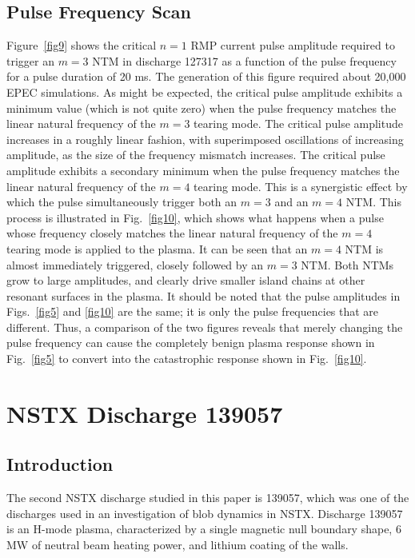 \documentclass[12pt,prb,aps]{revtex4-1}
\begin{document}
\subsection{Pulse Frequency Scan}
Figure~\ref{fig9} shows the critical $n=1$ RMP current  pulse amplitude required to trigger an $m=3$ NTM in discharge 127317 as a
function of the pulse frequency for a pulse duration of 20 ms. The generation of this figure required about 20,000 EPEC
simulations.  As might be expected, the critical pulse amplitude exhibits a minimum value (which is not quite zero) when
the pulse frequency matches the linear natural frequency of the $m=3$ tearing mode. The critical pulse amplitude
increases in a roughly linear fashion, with superimposed oscillations of increasing amplitude, as the size of the frequency mismatch increases. The critical pulse amplitude  exhibits a secondary minimum when the pulse frequency matches the
linear natural frequency of the $m=4$ tearing mode. This is a synergistic effect by which the pulse simultaneously trigger 
both an $m=3$ and an $m=4$ NTM. This process is illustrated in Fig.~\ref{fig10}, which shows what happens when
a pulse whose frequency closely matches the
linear natural frequency of the $m=4$ tearing mode is applied to the plasma. It can be seen that an $m=4$
NTM is almost immediately triggered, closely followed by an $m=3$ NTM. Both NTMs grow to large amplitudes, and
clearly drive smaller island chains at other resonant surfaces in the plasma. It should be noted that the pulse amplitudes
in Figs.~\ref{fig5} and \ref{fig10} are the same; it is only the pulse frequencies that are different. Thus,  a
comparison of the two figures reveals that merely changing the pulse frequency can cause the completely benign plasma response
shown in Fig.~\ref{fig5} to convert into the catastrophic response shown in Fig.~\ref{fig10}. 

\section{NSTX Discharge 139057}

\subsection{Introduction}
The second NSTX discharge  studied in this paper is 139057, which was one of the discharges used in an investigation of blob dynamics in NSTX.\cite{nstx1} Discharge 139057 is an H-mode plasma, characterized by a single magnetic null boundary shape,  6 MW of neutral
beam heating power, and  lithium coating of the walls. 
\end{document}
